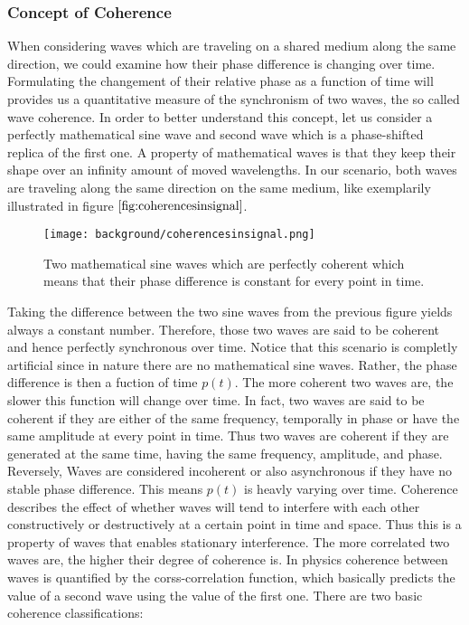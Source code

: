 \subsubsection{Concept of Coherence}
When considering waves which are traveling on a shared medium along the same direction, we could examine how their phase difference is changing over time. Formulating the changement of their relative phase as a function of time will provides us a quantitative measure of the synchronism of two waves, the so called wave coherence. In order to better understand this concept, let us consider a perfectly mathematical sine wave and second wave which is a phase-shifted replica of the first one. A property of mathematical waves is that they keep their shape over an infinity amount of moved wavelengths. In our scenario, both waves are traveling along the same direction on the same medium, like exemplarily illustrated in figure $\ref{fig:coherencesinsignal}$.
\begin{figure}[H]
  \centering
  \texttt{[image: background/coherencesinsignal.png]}
  \caption{Two mathematical sine waves which are perfectly coherent which means that their phase difference is constant for every point in time.}
  \label{fig:coherencesinsignal}
\end{figure}

Taking the difference between the two sine waves from the previous figure yields always a constant number. Therefore, those two waves are said to be coherent and hence perfectly synchronous over time. Notice that this scenario is completly artificial since in nature there are no mathematical sine waves. Rather, the phase difference is then a fuction of time $p(t)$. The more coherent two waves are, the slower this function will change over time. 
In fact, two waves are said to be coherent if they are either of the same frequency, temporally in phase or have the same amplitude at every point in time.
Thus two waves are coherent if they are generated at the same time, having the same frequency, amplitude, and phase. Reversely, Waves are considered incoherent or also asynchronous if they have no stable phase difference. This means $p(t)$ is heavly varying over time. Coherence describes the effect of whether waves will tend to interfere with each other constructively or destructively at a certain point in time and space. Thus this is a property of waves that enables stationary interference. The more correlated two waves are, the higher their degree of coherence is. In physics coherence between waves is quantified by the corss-correlation function, which basically predicts the value of a second wave using the value of the first one. There are two basic coherence classifications:

